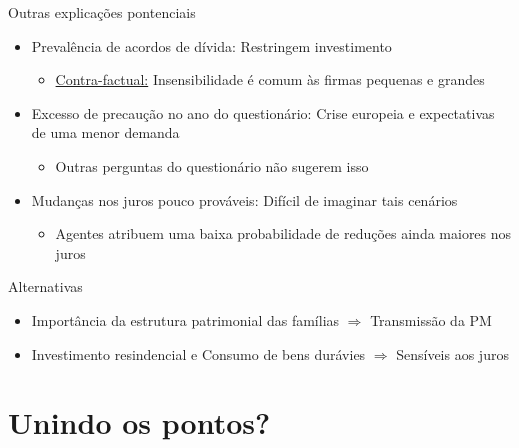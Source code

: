 \documentclass[presentation]{beamer}
\begin{document}
\begin{frame}[label={sec:orgf460b52}]{Outras explicações pontenciais}
\begin{itemize}
\item \alert{Prevalência de acordos de dívida:} Restringem investimento
\begin{itemize}
\item \uline{Contra-factual:} Insensibilidade é comum às firmas pequenas e grandes
\end{itemize}
\item \alert{Excesso de precaução no ano do questionário:} Crise europeia e expectativas de uma menor demanda
\begin{itemize}
\item Outras perguntas do questionário não sugerem isso
\end{itemize}
\item \alert{Mudanças nos juros pouco prováveis:} Difícil de imaginar tais cenários
\begin{itemize}
\item Agentes atribuem uma baixa probabilidade de reduções ainda maiores nos juros
\end{itemize}
\end{itemize}

\begin{block}{Alternativas}
\begin{itemize}
\item Importância da estrutura patrimonial das \alert{famílias} \(\Rightarrow\) Transmissão da PM
\item Investimento resindencial e Consumo de bens durávies \(\Rightarrow\) Sensíveis aos juros
\end{itemize}
\end{block}
\end{frame}

\section{Unindo os pontos?}
\label{sec:org070e4a7}
\end{document}
